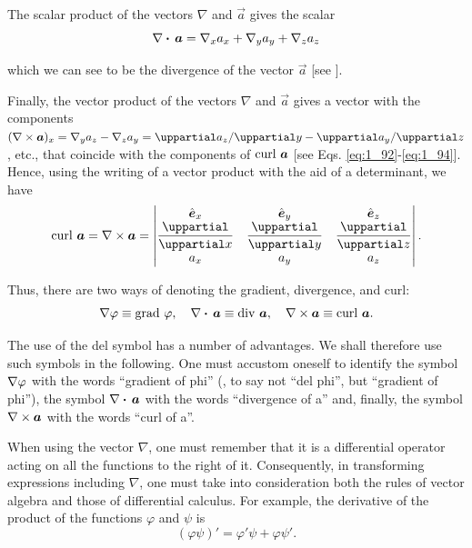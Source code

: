 The scalar product of the vectors $\nabla$ and $\vec{a}$ gives the scalar
\begin{equation}\label{eq:1_100}
	\nabla\boldsymbol{\cdot}\,\boldsymbol{a} = \nabla_{x}a_{x} + \nabla_{y}a_{y} + \nabla_{z}a_{z}
\end{equation}

\noindent
which we can see to be the divergence of the vector $\vec{a}$ [see ].

Finally, the vector product of the vectors $\nabla$ and $\vec{a}$ gives a vector with the components $(\curlop{\vec{a}})_x=\nabla_{y}a_{z} - \nabla_{z}a_{y}=\diffinpartial{a_z}{y}-\diffinpartial{a_y}{z}$, etc., that coincide with the components of $\text{curl~}\boldsymbol{a}$ [see Eqs. \eqref{eq:1_92}-\eqref{eq:1_94}]. Hence, using the writing of a vector product with the aid of a determinant, we have
\begin{equation}\label{1_101}
	\curl{\vec{a}} = \curlop{\vec{a}} = \begin{vmatrix}
	\vecuni{x} & \vecuni{y} & \vecuni{z}\\
	\diffpartial{}{x} & \diffpartial{}{y} & \diffpartial{}{z}\\
	a_x & a_y & a_z
	\end{vmatrix}.
\end{equation}

Thus, there are two ways of denoting the gradient, divergence, and curl:
\begin{equation*}
	\nabla\varphi\equiv\text{grad~}\varphi,\quad \nabla\boldsymbol{\cdot}\,\boldsymbol{a}\equiv\text{div~}\boldsymbol{a},\quad \nabla\times\boldsymbol{a}\equiv\text{curl~}\boldsymbol{a}.
\end{equation*}

\noindent
The use of the del symbol has a number of advantages. We shall therefore use such symbols in the following. One must accustom oneself to identify the symbol $\nabla\varphi$ with the words ``gradient of phi'' (\ie, to say not ``del phi'', but ``gradient of phi''), the symbol $\nabla\boldsymbol{\cdot}\,\boldsymbol{a}$ with the words ``divergence of a'' and, finally, the symbol $\nabla\times\boldsymbol{a}$ with the words ``curl of a''.

When using the vector $\nabla$, one must remember that it is a differential operator acting on all the functions to the right of it. Consequently, in transforming expressions including $\nabla$, one must take into consideration both the rules of vector algebra and those of differential calculus. For example, the derivative of the product of the functions $\varphi$ and $\psi$ is
\begin{equation*}
	(\varphi\psi)' = \varphi'\psi + \varphi\psi'.
\end{equation*}

